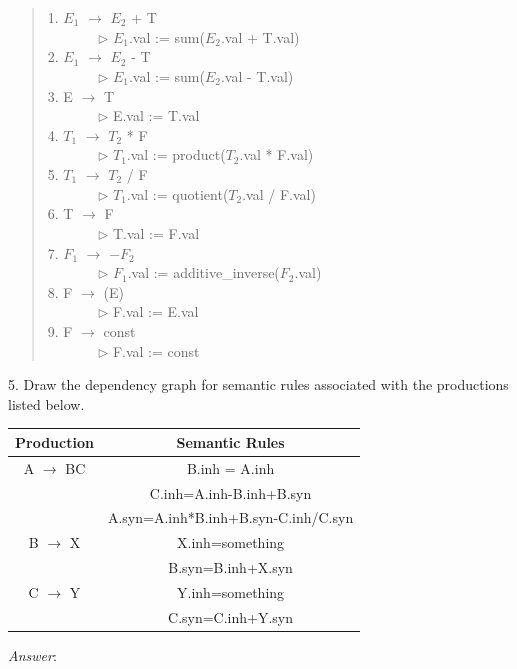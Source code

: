 \documentclass[a4paper,12pt]{article}
\begin{document}
\begin{quote}
1. $E_1$ $\longrightarrow$ $E_2$ + T \\
\verb+       +$\triangleright$ $E_1$.val := sum($E_2$.val + T.val)\\
2. $E_1$ $\longrightarrow$ $E_2$ - T \\
\verb+       +$\triangleright$ $E_1$.val := sum($E_2$.val - T.val)\\
3. E $\longrightarrow$  T \\
\verb+       +$\triangleright$ E.val := T.val\\
4. $T_1$ $\longrightarrow$ $T_2$ * F \\
\verb+       +$\triangleright$ $T_1$.val := product($T_2$.val * F.val)\\
5. $T_1$ $\longrightarrow$ $T_2$ / F \\
\verb+       +$\triangleright$ $T_1$.val := quotient($T_2$.val / F.val)\\
6. T $\longrightarrow$  F \\
\verb+       +$\triangleright$ T.val := F.val\\
7. $F_1$ $\longrightarrow$ $-F_2$\\
\verb+       +$\triangleright$ $F_1$.val := additive\_inverse($F_2$.val)\\
8. F $\longrightarrow$  (E) \\
\verb+       +$\triangleright$ F.val := E.val\\
9. F $\longrightarrow$ const\\
\verb+       +$\triangleright$ F.val := const\\
\end{quote}

5. Draw the dependency graph for semantic rules associated with the productions listed below.
\begin{center}
\begin{tabular}{|c|c|}
\hline
Production &  Semantic Rules\\
\hline
A $\longrightarrow$ BC & B.inh = A.inh\\
&C.inh=A.inh-B.inh+B.syn\\
&A.syn=A.inh*B.inh+B.syn-C.inh/C.syn\\
\hline
B $\longrightarrow$ X &X.inh=something\\
& B.syn=B.inh+X.syn\\
\hline
C $\longrightarrow$ Y & Y.inh=something\\
& C.syn=C.inh+Y.syn\\
\hline
\end{tabular}
\end{center}
\emph{Answer}:
\end{document}

